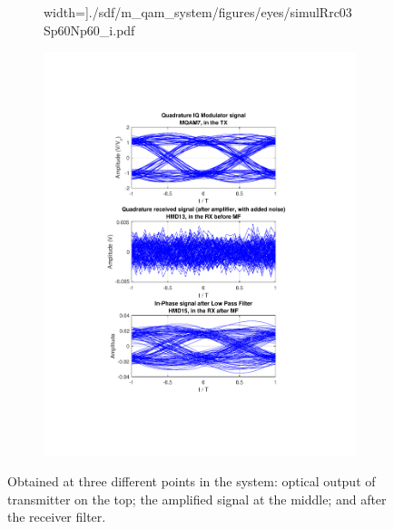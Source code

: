 \begin{refsection}
\begin{figure}[H]
\begin{minipage}{\linewidth}
\begin{subfigure}{.45\textwidth}
		width=\textwidth]{./sdf/m_qam_system/figures/eyes/simulRrc03Sp60Np60_i.pdf}
	\end{subfigure}
	\begin{subfigure}{.45\textwidth}
		\centering
		\includegraphics[clip, trim=4cm 4cm 4cm 4cm, 
		width=\textwidth]{./sdf/m_qam_system/figures/eyes/simulRrc03Sp60Np60_q.pdf}
	\end{subfigure}
	
	\caption{
		Obtained at three different points in the system: optical output of transmitter on the top;
		the amplified signal at the middle; and
		after the receiver filter.
		\label{fig:eyes_n_rc_60_03}}
	\end{minipage}
\end{figure}




\end{refsection}
